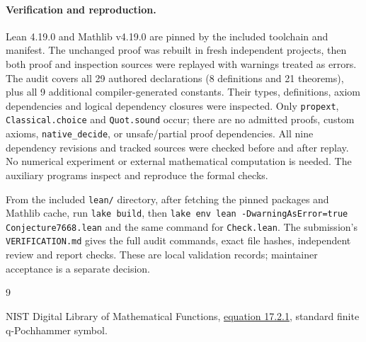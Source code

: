 \documentclass[11pt]{article}
\begin{document}
\paragraph{Verification and reproduction.}
Lean 4.19.0 and Mathlib v4.19.0 are pinned by the included toolchain and
manifest. The unchanged proof was rebuilt in fresh independent projects,
then both proof and inspection sources were replayed with warnings treated
as errors. The audit covers all 29 authored declarations (8 definitions and
21 theorems), plus all 9 additional compiler-generated constants.
Their types, definitions, axiom dependencies and logical dependency
closures were inspected. Only \texttt{propext}, \texttt{Classical.choice}
and \texttt{Quot.sound} occur; there are no admitted proofs, custom axioms,
\texttt{native\_decide}, or unsafe/partial proof dependencies.
All nine dependency revisions and tracked sources were checked before and
after replay. No numerical experiment or external mathematical computation
is needed. The auxiliary programs inspect and reproduce the formal checks.

From the included \texttt{lean/} directory, after fetching the pinned
packages and Mathlib cache, run \texttt{lake build}, then
\texttt{lake env lean -DwarningAsError=true Conjecture7668.lean}
and the same command for \texttt{Check.lean}. The submission's
\texttt{VERIFICATION.md} gives the full audit commands, exact file hashes,
independent review and report checks. These are local validation records;
maintainer acceptance is a separate decision.

\begin{thebibliography}{9}
\raggedright
{} NIST Digital Library of Mathematical Functions,
\href{https://dlmf.nist.gov/17.2.E1}{equation 17.2.1}, standard finite
q-Pochhammer symbol.
\end{thebibliography}
\end{document}
